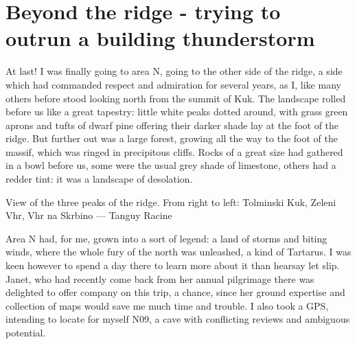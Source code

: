\section{Beyond the ridge - trying to outrun a building thunderstorm}
\begin{marginfigure}
\end{marginfigure}
At last! I was finally going to area N, going to the other side of the ridge, a side which had commanded respect and admiration for several years, as I, like many others before stood looking north from the summit of Kuk. The landscape rolled before us like a great  tapestry: little white peaks dotted around, with grass green aprons and tufts of dwarf pine offering their darker shade lay at the foot of the ridge. But further out was a large forest, growing all the way to the foot of the  massif, which was ringed in precipitous cliffs. Rocks of a great size had gathered in a bowl before us, some were the usual grey shade of limestone, others had a redder tint: it was a landscape of desolation.

\begin{pagefigure}
    \checkoddpage \ifoddpage \forcerectofloat \else \forceversofloat \fi
    \centering
    \label{AreaNrob}
    \caption{View of the three peaks of the ridge. From right to left: Tolminski Kuk, Zeleni Vhr, Vhr na Skrbino --- Tanguy Racine}
\end{pagefigure}

Area N had, for me, grown into a sort of legend: a land of storms and biting winds, where the whole fury of the north was unleashed, a kind of Tartarus. I was keen however to spend a day there to learn more about it than hearsay let slip. Janet, who had recently come back from her annual pilgrimage there was delighted to offer company on this trip, a chance, since her ground expertise and collection of maps would save me much time and trouble. I also took a GPS, intending to locate for myself N09, a cave with conflicting reviews and ambiguous potential. 

